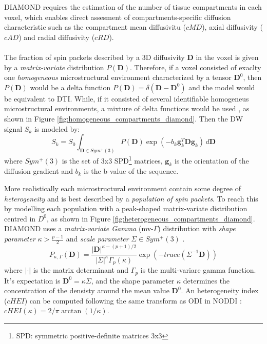  DIAMOND requires the estimation of the number of tissue compartments in each voxel, which enables direct assesment of compartments-specific diffusion characteristic such as the compartment mean diffusivitu ($cMD$), axial diffusivity ($cAD$) and radial diffusivity ($cRD$). 
 \\\\
 The fraction of spin packets described by a 3D diffusivity $\mathbf{D}$ in the voxel is given by a \emph{matrix-variate} distribution $P(\mathbf{D})$. Therefore, if a voxel consisted of exaclty one \emph{homogeneous} microstructural environment characterized by a tensor $\mathbf{D}^0$, then $P(\mathbf{D})$ would be a delta function $P(\mathbf{D})=\delta(\mathbf{D}-\mathbf{D}^0)$ and the model would be equivalent to DTI. While, if it consisted of several identifiable homogeneus microstructural environments, a mixture of delta functions would be used \cite{scherrer2016diamond}, as shown in Figure \ref{fig:homogeneous_compartments_diamond}. Then the DW signal $S_k$ is modeled by:
 \begin{equation}\label{eq:1.26}
   S_k = S_0 \int_{\mathbf{D}\in Sym^{+}(3)} P(\mathbf{D})\exp(-b_k\mathbf{g}_k^T\mathbf{D}\mathbf{g}_k) \,d\mathbf{D}
 \end{equation}
 where $Sym^{+}(3)$ is the set of 3x3 SPD\footnote{SPD: symmetric positive-definite matrices 3x3} matrices, $\mathbf{g}_k$ is the orientation of the diffusion gradient and $b_k$ is the b-value of the sequence.

 More realistically each microstructural environment contain some degree of \emph{heterogeneity} and is best described by a \emph{population of spin packets}. To reach this by modelling each population with a peak-shaped matrix-variate distribution centred in $D^0$, as shown in Figure \ref{fig:heterogeneous_compartments_diamond}. DIAMOND uses a \emph{matrix-variate Gamma} (mv-$\Gamma$) distribution with \emph{shape parameter} $\kappa > \frac{p-1}{2}$ and \emph{scale parameter} $\Sigma \in Sym^{+}(3)$ \cite{scherrer2016diamond}.
 \begin{equation}
   P_{\kappa,\Gamma}(\mathbf{D}) = \frac{|\mathbf{D}|^{\kappa-(p+1)/2}}{|\Sigma|^\kappa \Gamma_p(\kappa)}\exp (-trace(\Sigma^{-1}\mathbf{D}))
 \end{equation}
 where $|\cdot|$ is the matrix determinant and $\Gamma_p$ is the multi-variare gamma function. It's expectation is $\mathbf{D}^0=\kappa\Sigma$, and the shape parameter $\kappa$ determines the concentration of the densisty around the mean value $\mathbf{D}^0$. An heterogeneity index ($cHEI$) can be computed following the same transform as ODI in NODDI \cite{zhang2012noddi}: $cHEI(\kappa) = 2/\pi \arctan (1/\kappa)$.

